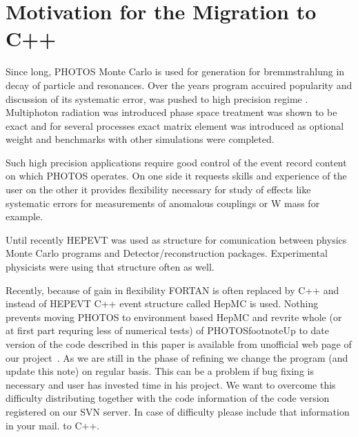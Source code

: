 \documentclass[]{Photos_interface_design}
\begin{document}
\maketitle

\tableofcontents{}

\newpage

\section{Motivation for the Migration to C++}
Since long, PHOTOS Monte Carlo \cite{Barberio:1990ms,Barberio:1993qi} is used for generation for bremmstrahlung in decay of particle and resonances. Over the years program accuired
popularity and discussion of its systematic error, was pushed to high 
precision regime \cite{Golonka:2006tw}. Multiphoton radiation was introduced \cite{Golonka:2005pn} phase space treatment was shown to be exact \cite{Nanava:2006vv} and for several processes \cite{Golonka:2006tw,Nanava:2006vv,Nanava:2009vg}
exact matrix element was introduced as optional weight and benchmarks with 
other simulations were completed. 

 Such high precision applications require good control of the event record content on which PHOTOS operates. On one side it 
requests skills and experience of the user on the other it provides 
flexibility necessary for study of effects like systematic errors for measurements of anomalous couplings or W mass for example.

Until recently HEPEVT \cite{Dobbs:2001ck} was used as structure for comunication between physics Monte Carlo programs and Detector/reconstruction packages. Experimental physicists were using that structure often as well.

Recently, because of gain in flexibility FORTAN is often replaced by C++ and 
instead of HEPEVT   C++ event structure called HepMC is used. Nothing prevents 
moving PHOTOS to environment based HepMC and revrite whole (or at first part
requring less of numerical tests) 
of PHOTOSfootnote{Up to date version of the code described in this paper is
available from unofficial web page of our project~\cite{photosC++}. 
As we are still in the phase of refining
we change the program (and update this note) on regular basis. 
This can be a problem if bug fixing is necessary and user has invested time in his project. We want to overcome this difficulty distributing
together with the code information of the code version registered on our 
SVN server. In case of difficulty please include that information in your mail. }
 to C++. 
\end{document}
